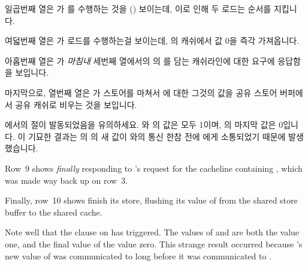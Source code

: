 \begin{fcvref}
\begin{fcvref}
일곱번째 열은  가  를 수행하는 것을 ()
보이는데, 이로 인해 두 로드는 순서를 지킵니다.

여덟번째 열은  가  로드를 수행하는걸 보이는데,  의
캐쉬에서 값 0을 즉각 가져옵니다.

아홉번째 열은  가 \emph{마침내} 세번째 열에서의  의  를
담는 캐쉬라인에 대한 요구에 응답함을 보입니다.

마지막으로, 열번째 열은  가 스토어를 마쳐서  에 대한 그것의 값을
공유 스토어 버퍼에서 공유 캐쉬로 비우는 것을 보입니다.

 에서의  절이 발동되었음을 유의하세요.
 와  의 값은 모두 1이며,  의 마지막 값은 0입니다.
이 기묘한 결과는  의  의 새 값이  와의 통신 한참 전에
 에게 소통되었기 때문에 발생했습니다.
\end{fcvref}

\iffalse

Row~9 shows  \emph{finally} responding to 's request for
the cacheline containing , which was made way back up on row~3.

Finally, row~10 shows  finish its store, flushing its value of
 from the shared store buffer to the shared cache.

Note well that the  clause on  has triggered.
The values of  and  are both the value one, and
the final value of  the value zero.
This strange result occurred because 's new value of  was
communicated to  long before it was communicated to .
\end{fcvref}

